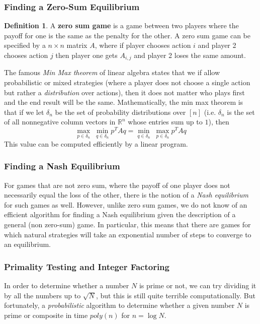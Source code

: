 \documentclass[a4paper, 12pt]{report}
\theoremstyle{remark}
\theoremstyle{definition}
\newtheorem{definition}{Definition}[section]
\begin{document}
\subsubsection{Finding a Zero-Sum Equilibrium}

\begin{definition}
A \textbf{zero sum game} is a game between two players where the payoff for one is the same as the penalty for the other. A zero sum game can be specified by a $n \times n$ matrix $A$, where if player chooses action $i$ and player 2 chooses action $j$ then player one gets $A_{i, j}$ and player 2 loses the same amount. 
\end{definition}

The famous \textit{Min Max theorem} of linear algebra states that we if allow probabilistic or mixed strategies (where a player does not choose a single action but rather a \textit{distribution} over actions), then it does not matter who plays first and the end result will be the same. Mathematically, the min max theorem is that if we let $\delta_n$ be the set of probability distributions over $[n]$ (i.e. $\delta_n$ is the set of all nonnegative column vectors in $\mathbb{R}^n$ whose entries sum up to $1$), then 
\[\max_{p \in \delta_n} \; \min_{q \in \delta_n} p^T A q = \min_{q \in \delta_n} \; \max_{p \in \delta_n} p^T A q\]
This value can be computed efficiently by a linear program. 

\subsubsection{Finding a Nash Equilibrium}
For games that are not zero sum, where the payoff of one player does not necessarily equal the loss of the other, there is the notion of a \textit{Nash equilibrium} for such games as well. However, unlike zero sum games, we do not know of an efficient algorithm for finding a Nash equilibrium given the description of a general (non zero-sum) game. In particular, this means that there are games for which natural strategies will take an exponential number of steps to converge to an equilibrium. 

\subsubsection{Primality Testing and Integer Factoring}
In order to determine whether a number $N$ is prime or not, we can try dividing it by all the numbers up to $\sqrt{N}$, but this is still quite terrible computationally. But fortunately, a \textit{probabilistic} algorithm to determine whether a given number $N$ is prime or composite in time $poly(n)$ for $n = \log N$. 
\end{document}
